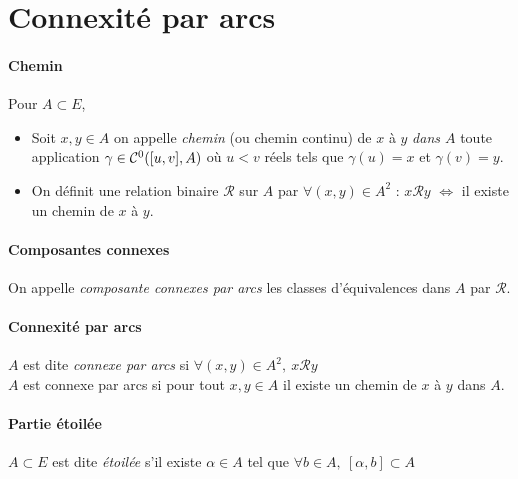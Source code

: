 \section{Connexité par arcs}
		
		\vspace{-15pt}
		\traitd
		\paragraph{Chemin}
			Pour $A\subset E$, 
			\begin{itemize}
				\item Soit $x,y\in A$ on appelle \emph{chemin} (ou chemin continu) de $x$ à $y$ \emph{dans $A$} toute application $\gamma \in {\mathcal{C}}^0 ([u,v],A)$ où $u<v$ réels tels que $\gamma (u) = x$ et $\gamma (v) = y$.
				\item On définit une relation binaire $\mathcal{R}$ sur $A$ par $\forall (x,y) \in A^2$ : $x\mathcal{R} y$ $\Leftrightarrow$ il existe un chemin de $x$ à $y$.
			\end{itemize} 
		\trait
		
		
		\traitd
		\paragraph{Composantes connexes} 
			On appelle \emph{composante connexes par arcs} les classes d'équivalences dans $A$ par $\mathcal{R}$.
		\trait \vspace{-15pt}
		
		 \vspace{-25pt}
		
		\traitd
		\paragraph{Connexité par arcs}
			$A$ est dite \emph{connexe par arcs} si $\forall (x,y) \in A^2 ,~x\mathcal{R} y$ \\$A$ est connexe par arcs si 
			pour tout $x,y \in A$ il existe un chemin de $x$ à $y$ dans $A$.	
		\trait
		
		
		\traitd
		\paragraph{Partie étoilée}
			$A\subset E$ est dite \emph{étoilée} s'il existe $\alpha	\in A$ tel que $\forall b \in A ,~[\alpha ,b] \subset A$ 
		\trait
		
